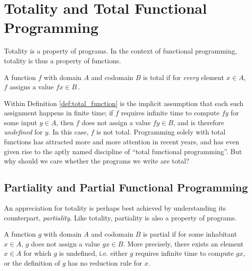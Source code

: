 \section{Totality and Total Functional Programming}
Totality is a property of programs. In the context of functional programming,
totality is thus a property of functions. 

\begin{definition}
\label{def:total_function}
A function $f$ with domain $A$ and codomain $B$ is total if for \emph{every}
element $x\in A$, $f$ assigns a value
$f x\in B$\,\citep{Turner04totalfunctional}.
\end{definition}

Within Definition \ref{def:total_function} is the implicit assumption that each
such assignment happens in finite time; if $f$ requires infinite time to compute
$f y$ for some input $y\in A$, then $f$ does not assign a value $f y\in B$, and is
therefore \emph{undefined} for $y$. In this case, $f$ is not total. Programming
solely with total functions has attracted more and more attention in recent
years, and has even given rise to the aptly named discipline of ``total
functional programming''. But why should we care whether the programs we write
are total?

\subsection{Partiality and Partial Functional Programming}
An appreciation for totality is perhaps best achieved by understanding its
counterpart, \emph{partiality}. Like totality, partiality is also a property of
programs. 

\begin{definition}
  A function $g$ with domain $A$ and codomain $B$ is partial if for some
  inhabitant $x\in A$, $g$ does not assign a value $g x\in B$. More precisely, there exists
  an element $x\in A$ for which $g$ is undefined, i.e. either $g$
  requires infinite time to compute $g x$, or the definition of $g$ has no
  reduction rule for $x$.
\end{definition}

